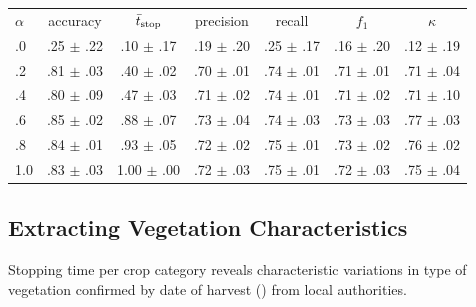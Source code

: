 \documentclass[a0]{tumposter}
\begin{document}
\begin{minipage}[t]{.32\textwidth}
	\begin{table}
		
		\scriptsize
		\hspace{0em}\begin{tabular}{lcccccc}
			\toprule\small
			\textbf{$\alpha$} & accuracy & $\bar{t}_\text{stop}$  & precision & recall & $f_1$ & $\kappa$ \\
			\cmidrule(lr){0-0}\cmidrule(lr){1-1}\cmidrule(lr){2-2}\cmidrule(lr){3-3}\cmidrule(lr){4-4}\cmidrule(lr){5-5}\cmidrule(lr){6-6}\cmidrule(lr){7-7}
			.0 & .25 $\pm$ .22 & .10 $\pm$ .17 & .19 $\pm$ .20 & .25 $\pm$ .17 & .16 $\pm$ .20 & .12 $\pm$ .19 \\
			.2 & .81 $\pm$ .03 & .40 $\pm$ .02 & .70 $\pm$ .01 & .74 $\pm$ .01 & .71 $\pm$ .01 & .71 $\pm$ .04 \\
			.4 & .80 $\pm$ .09 & .47 $\pm$ .03 & .71 $\pm$ .02 & .74 $\pm$ .01 & .71 $\pm$ .02 & .71 $\pm$ .10 \\
			.6 & .85 $\pm$ .02 & .88 $\pm$ .07 & .73 $\pm$ .04 & .74 $\pm$ .03 & .73 $\pm$ .03 & .77 $\pm$ .03 \\
			.8 & .84 $\pm$ .01 & .93 $\pm$ .05 & .72 $\pm$ .02 & .75 $\pm$ .01 & .73 $\pm$ .02 & .76 $\pm$ .02 \\
			1.0 & .83 $\pm$ .03 & 1.00 $\pm$ .00 & .72 $\pm$ .03 & .75 $\pm$ .01 & .72 $\pm$ .03 & .75 $\pm$ .04 \\
			\bottomrule
		\end{tabular}
	
	
		
	\end{table}
	
	
	\subsection{Extracting Vegetation Characteristics} \par
	
	{\footnotesize Stopping time per crop category reveals characteristic variations in type of vegetation confirmed by date of harvest (\druschdatum) from local authorities. \par} 
	\vspace{.5em}
	
	
\end{minipage}
\end{document}
